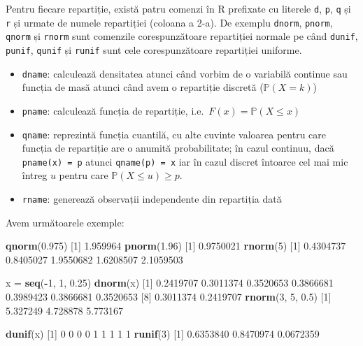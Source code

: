 \documentclass[]{article}
\newenvironment{Shaded}{\begin{snugshade}}{\end{snugshade}}
\newcommand{\DecValTok}[1]{\textcolor[rgb]{0.00,0.00,0.81}{#1}}
\newcommand{\FloatTok}[1]{\textcolor[rgb]{0.00,0.00,0.81}{#1}}
\newcommand{\KeywordTok}[1]{\textcolor[rgb]{0.13,0.29,0.53}{\textbf{#1}}}
\newcommand{\NormalTok}[1]{#1}
\newcommand{\OperatorTok}[1]{\textcolor[rgb]{0.81,0.36,0.00}{\textbf{#1}}}
\newcommand{\StringTok}[1]{\textcolor[rgb]{0.31,0.60,0.02}{#1}}
\begin{document}
Pentru fiecare repartiție, există patru comenzi în R prefixate cu
literele \texttt{d}, \texttt{p}, \texttt{q} și \texttt{r} și urmate de
numele repartiției (coloana a 2-a). De exemplu \texttt{dnorm},
\texttt{pnorm}, \texttt{qnorm} și \texttt{rnorm} sunt comenzile
corespunzătoare repartiției normale pe când \texttt{dunif},
\texttt{punif}, \texttt{qunif} și \texttt{runif} sunt cele
corespunzătoare repartiției uniforme.

\begin{itemize}
\item
  \texttt{dname}: calculează densitatea atunci când vorbim de o
  variabilă continue sau funcția de masă atunci când avem o repartiție
  discretă (\(\mathbb{P}(X=k)\))
\item
  \texttt{pname}: calculează funcția de repartiție,
  i.e.~\(F(x)=\mathbb{P}(X\leq x)\)
\item
  \texttt{qname}: reprezintă funcția cuantilă, cu alte cuvinte valoarea
  pentru care funcția de repartiție are o anumită probabilitate; în
  cazul continuu, dacă \texttt{pname(x)\ =\ p} atunci
  \texttt{qname(p)\ =\ x} iar în cazul discret întoarce cel mai mic
  întreg \(u\) pentru care \(\mathbb{P}(X\leq u)\geq p\).
\item
  \texttt{rname}: generează observații independente din repartiția dată
\end{itemize}

Avem următoarele exemple:

\begin{Shaded}
\begin{Highlighting}[]
\KeywordTok{qnorm}\NormalTok{(}\FloatTok{0.975}\NormalTok{)}
\NormalTok{[}\DecValTok{1}\NormalTok{] }\FloatTok{1.959964}
\KeywordTok{pnorm}\NormalTok{(}\FloatTok{1.96}\NormalTok{)}
\NormalTok{[}\DecValTok{1}\NormalTok{] }\FloatTok{0.9750021}
\KeywordTok{rnorm}\NormalTok{(}\DecValTok{5}\NormalTok{)}
\NormalTok{[}\DecValTok{1}\NormalTok{] }\FloatTok{0.4304737} \FloatTok{0.8405027} \FloatTok{1.9550682} \FloatTok{1.6208507} \FloatTok{2.1059503}

\NormalTok{x =}\StringTok{ }\KeywordTok{seq}\NormalTok{(}\OperatorTok{-}\DecValTok{1}\NormalTok{, }\DecValTok{1}\NormalTok{, }\FloatTok{0.25}\NormalTok{)}
\KeywordTok{dnorm}\NormalTok{(x)}
\NormalTok{[}\DecValTok{1}\NormalTok{] }\FloatTok{0.2419707} \FloatTok{0.3011374} \FloatTok{0.3520653} \FloatTok{0.3866681} \FloatTok{0.3989423} \FloatTok{0.3866681} \FloatTok{0.3520653}
\NormalTok{[}\DecValTok{8}\NormalTok{] }\FloatTok{0.3011374} \FloatTok{0.2419707}
\KeywordTok{rnorm}\NormalTok{(}\DecValTok{3}\NormalTok{, }\DecValTok{5}\NormalTok{, }\FloatTok{0.5}\NormalTok{)}
\NormalTok{[}\DecValTok{1}\NormalTok{] }\FloatTok{5.327249} \FloatTok{4.728878} \FloatTok{5.773167}

\KeywordTok{dunif}\NormalTok{(x)}
\NormalTok{[}\DecValTok{1}\NormalTok{] }\DecValTok{0} \DecValTok{0} \DecValTok{0} \DecValTok{0} \DecValTok{1} \DecValTok{1} \DecValTok{1} \DecValTok{1} \DecValTok{1}
\KeywordTok{runif}\NormalTok{(}\DecValTok{3}\NormalTok{)}
\NormalTok{[}\DecValTok{1}\NormalTok{] }\FloatTok{0.6353840} \FloatTok{0.8470974} \FloatTok{0.0672359}
\end{Highlighting}
\end{Shaded}
\end{document}
